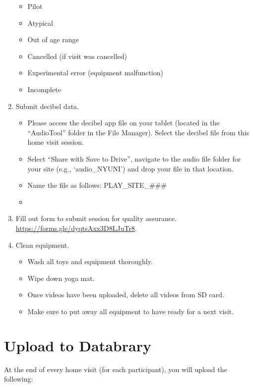 \documentclass[
  12pt,
]{book}
\providecommand{\tightlist}{%
  \setlength{\itemsep}{0pt}\setlength{\parskip}{0pt}}
\begin{document}
\begin{enumerate}
  \begin{itemize}
  \tightlist
  \item
    Pilot
  \item
    Atypical
  \item
    Out of age range
  \item
    Cancelled (if visit was cancelled)
  \item
    Experimental error (equipment malfunction)
  \item
    Incomplete
  \end{itemize}
\item
  Submit decibel data.

  \begin{itemize}
  \tightlist
  \item
    Please access the decibel app file on your tablet (located in the ``AudioTool'' folder in the File Manager). Select the decibel file from this home visit session.
  \item
    Select ``Share with Save to Drive'', navigate to the audio file folder for your site (e.g., `audio\_NYUNI') and drop your file in that location.
  \item
    Name the file as follows: PLAY\_SITE\_\#\#\#
  \item
  \end{itemize}
\item
  Fill out form to submit session for quality assurance. \url{https://forms.gle/dyqtsAxx3D8LJuTr8}.
\item
  Clean equipment.

  \begin{itemize}
  \tightlist
  \item
    Wash all toys and equipment thoroughly.
  \item
    Wipe down yoga mat.
  \item
    Once videos have been uploaded, delete all videos from SD card.
  \item
    Make sure to put away all equipment to have ready for a next visit.
  \end{itemize}
\end{enumerate}

\hypertarget{upload-to-databrary}{%
\section{Upload to Databrary}\label{upload-to-databrary}}

At the end of every home visit (for each participant), you will upload the following:
\end{document}
